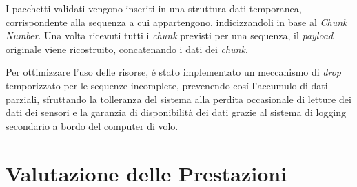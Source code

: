 \documentclass[12pt,a4paper,twoside]{book}
\begin{document}
I pacchetti validati vengono inseriti in una struttura dati temporanea, corrispondente
alla sequenza a cui appartengono, indicizzandoli in base al \emph{Chunk Number}.
Una volta ricevuti tutti i \emph{chunk} previsti per una sequenza, il \emph{payload}
originale viene ricostruito, concatenando i dati dei \emph{chunk}.

Per ottimizzare l'uso delle risorse, \'e stato implementato un meccanismo di \emph{drop}
temporizzato per le sequenze incomplete, prevenendo cos\'i l'accumulo di dati parziali,
sfruttando la tolleranza del sistema alla perdita occasionale di letture dei dati
dei sensori e la garanzia di disponibilità dei dati grazie al sistema di logging secondario a
bordo del computer di volo.

\chapter{Valutazione delle Prestazioni} \label{chap:performance}
\vspace{-0.5cm}
\end{document}

